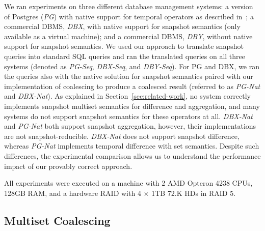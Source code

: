 %
We ran experiments on three different database management systems: a
version of Postgres (\textit{PG}) with native support for temporal
operators as described in~\cite{DignosBG12,DignosBGJ16}; a commercial
DBMS, \textit{DBX}, with native support for snapshot semantics (only
available as a virtual machine); and a commercial DBMS, \textit{DBY},
without native support for snapshot semantics.
%
We used our approach to translate snapshot queries into standard SQL
queries and ran the translated queries on all three systems (denoted
as \textit{PG-Seq}, \textit{DBX-Seq}, and \textit{DBY-Seq}).
For PG and DBX, we ran the queries also with the native
solution for snapshot semantics paired with our implementation of
coalescing to produce a coalesced result (referred to as
\textit{PG-Nat} and \textit{DBX-Nat}).
%
As explained in Section~\ref{sec:related-work}, no system correctly
implements snapshot multiset semantics for difference and
aggregation, and many systems do not support snapshot semantics for
these operators at all. \textit{DBX-Nat} and \textit{PG-Nat}
both support snapshot aggregation, however, their implementations are
not snapshot-reducible. \textit{DBX-Nat} does not support snapshot difference,
whereas \textit{PG-Nat} implements temporal difference with set
semantics.  Despite such differences, the experimental comparison
allows us to understand the performance impact of our provably correct
approach.

All experiments were executed on a machine with 2 AMD Opteron 4238 CPUs, 128GB
RAM, and a hardware RAID with 4 $\times$ 1TB 72.K HDs in RAID 5. 



\subsection{Multiset Coalescing}
\label{sssec:multiset-coalescing}

